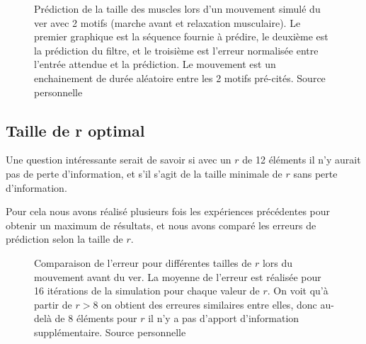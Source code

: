 \begin{figure}[ht]
   \begin{center}
   \end{center}
   \caption[Prédiction de la taille des muscles lors d'un mouvement avec 2
   motifs]{Prédiction de la taille des muscles lors d'un mouvement simulé du ver
   avec 2 motifs (marche avant et relaxation musculaire). Le premier graphique est
   la séquence fournie à prédire, le deuxième est la prédiction du filtre, et le
   troisième est l'erreur normalisée entre l'entrée attendue et la prédiction.
   Le mouvement est un enchainement de durée aléatoire entre les 2 motifs
   pré-cités. Source personnelle}
   \label{fig:sequence_mouvement_complexe_2pattern}
\end{figure}


\subsection{Taille de r optimal} %
\label{sub:Taille de r optimal}

Une question intéressante serait de savoir si avec un $r$ de 12 éléments il n'y aurait
pas de perte d'information, et s'il s'agit de la taille minimale de $r$ sans perte
d'information.

Pour cela nous avons réalisé plusieurs fois les expériences précédentes pour obtenir
un maximum de résultats, et nous avons comparé les erreurs de prédiction selon la
taille de $r$.


\begin{figure}[ht]
   \begin{center}
   \end{center}
   \caption[Comparaison de l'erreur pour différents $r$ lors du mouvement avant]{
   Comparaison de l'erreur pour différentes tailles de $r$ lors du mouvement avant
   du ver. La moyenne de l'erreur est réalisée pour 16 itérations de la simulation
   pour chaque valeur de $r$. On voit qu'à partir de $r > 8$ on obtient des erreures similaires entre elles, 
donc au-delà de 8 éléments pour $r$ il n'y a pas
   d'apport d'information supplémentaire. Source personnelle}
   \label{fig:comparaison_r_mouvement_simple}
\end{figure}

